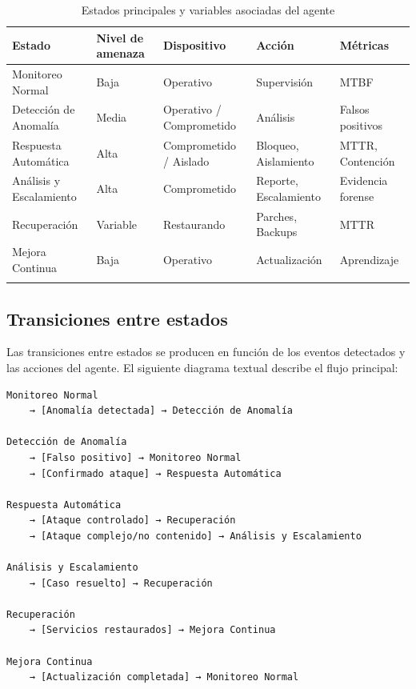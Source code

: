 \documentclass[letterpaper, 12pt]{report}
\begin{document}
\begin{table}[H]
      \small
      \centering
      \begin{tabularx}{\textwidth}{>{\raggedright\arraybackslash}X
                  >{\raggedright\arraybackslash}X
                  >{\raggedright\arraybackslash}X
                  >{\raggedright\arraybackslash}X
                  >{\raggedright\arraybackslash}X}
            \toprule{}
            Estado                  & Nivel de amenaza & Dispositivo              & Acción                & Métricas          \\
            \midrule{}
            Monitoreo Normal        & Baja             & Operativo                & Supervisión           & MTBF              \\
            Detección de Anomalía   & Media            & Operativo / Comprometido & Análisis              & Falsos positivos  \\
            Respuesta Automática    & Alta             & Comprometido / Aislado   & Bloqueo, Aislamiento  & MTTR, Contención  \\
            Análisis y Escalamiento & Alta             & Comprometido             & Reporte, Escalamiento & Evidencia forense \\
            Recuperación            & Variable         & Restaurando              & Parches, Backups      & MTTR              \\
            Mejora Continua         & Baja             & Operativo                & Actualización         & Aprendizaje       \\
            \bottomrule{}
      \end{tabularx}
      \caption{Estados principales y variables asociadas del agente}
\end{table}

\subsection{Transiciones entre estados}

Las transiciones entre estados se producen en función de los eventos detectados
y las acciones del agente. El siguiente diagrama textual describe el flujo
principal:

\begin{verbatim}
Monitoreo Normal
    → [Anomalía detectada] → Detección de Anomalía

Detección de Anomalía
    → [Falso positivo] → Monitoreo Normal
    → [Confirmado ataque] → Respuesta Automática

Respuesta Automática
    → [Ataque controlado] → Recuperación
    → [Ataque complejo/no contenido] → Análisis y Escalamiento

Análisis y Escalamiento
    → [Caso resuelto] → Recuperación

Recuperación
    → [Servicios restaurados] → Mejora Continua

Mejora Continua
    → [Actualización completada] → Monitoreo Normal
\end{verbatim}
\end{document}
